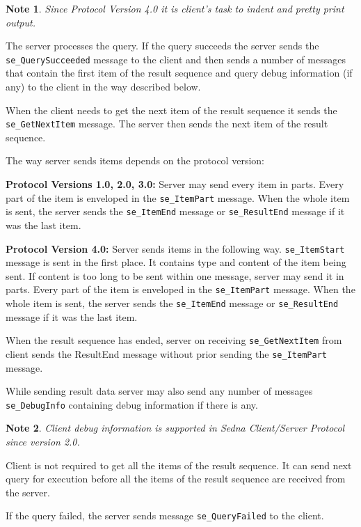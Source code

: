 \documentclass[a4paper,12pt]{article}
\newtheorem{note}{Note}
\begin{document}
\begin{note}
Since Protocol Version 4.0 it is client's task to indent and pretty print output.
\end{note}

The server processes the query. If the query succeeds the server sends the \verb!se_QuerySucceeded! message to the client and then sends a number of messages that contain the first item of the result sequence and query debug information (if any) to the client in the way described below.

When the client needs to get the next item of the result sequence it sends the \verb!se_GetNextItem! message. The server then sends the next item of the result sequence.

The way server sends items depends on the protocol version:

\textbf{Protocol Versions 1.0, 2.0, 3.0:} Server may send every item in parts. Every part of the item is enveloped in the \verb!se_ItemPart! message. When the whole item is sent, the server sends the \verb!se_ItemEnd! message or \verb!se_ResultEnd! message if it was the last item.

\textbf{Protocol Version 4.0:} Server sends items in the following way. \verb!se_ItemStart! message is sent in the first place. It contains type and content of the item being sent. If content is too long to be sent within one message, server may send it in parts. Every part of the item is enveloped in the \verb!se_ItemPart! message. When the whole item is sent, the server sends the \verb!se_ItemEnd! message or \verb!se_ResultEnd! message if it was the last item.

When the result sequence has ended, server on receiving \verb!se_GetNextItem! from client sends the ResultEnd message without prior sending the \verb!se_ItemPart! message.

While sending result data server may also send any number of messages \verb!se_DebugInfo! containing debug information if there is any.

\begin{note}
Client debug information is supported in Sedna Client/Server Protocol since version 2.0.
\end{note}

Client is not required to get all the items of the result sequence. It can send next query for execution before all the items of the result sequence are received from the server.

If the query failed, the server sends message \verb!se_QueryFailed! to the client.
\end{document}
